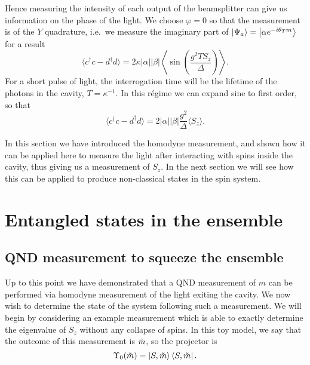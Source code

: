 Hence measuring the intensity of each output of the beamsplitter can give us
information on the phase of the light. We choose $\varphi = 0$ so that the
measurement is of the $Y$ quadrature, i.e.\ we measure the imaginary part of
$\ket{\Psi_a} = \ket{\alpha e^{-i\theta_Tm}}$ for a result
%
\begin{equation}
  \langle c^\dagger c - d^\dagger d\rangle =  2\kappa
  |\alpha||\beta|\left\langle\sin(\frac{g^2 T S_z}{\Delta})\right\rangle.
\end{equation}
%
For a short pulse of light, the interrogation time will be the lifetime of the
photons in the cavity, $T = \kappa^{-1}$. In this r\'egime we can expand sine
to first order, so that
%
\begin{equation}
  \langle c^\dagger c - d^\dagger d\rangle = 2|\alpha||\beta|
  \frac{g^2}{\Delta}\langle S_z\rangle.
  \label{eqn:homomeas}
\end{equation}

In this section we have introduced the homodyne measurement, and shown how it
can be applied here to measure the light after interacting with spins inside
the cavity, thus giving us a measurement of $S_z$. In the next section we will
see how this can be applied to produce non-classical states in the spin system.

\section{Entangled states in the ensemble}



\subsection{QND measurement to squeeze the ensemble}

Up to this point we have demonstrated that a QND measurement of $m$ can be
performed via homodyne measurement of the light exiting the cavity. We now wish
to determine the state of the system following such a measurement. We will
begin by considering an example measurement which is able to exactly determine
the eigenvalue of $S_z$ without any collapse of spins. In this toy model, we
say that the outcome of this measurement is $\tilde{m}$, so the projector is
%
\begin{equation}
  \Upsilon_0(\tilde{m}) = \ket{S, \tilde{m}}\bra{S, \tilde{m}}.
\end{equation}

